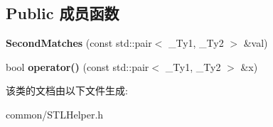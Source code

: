 \subsection*{Public 成员函数}
\begin{DoxyCompactItemize}
\item 
\hypertarget{class_second_matches_a9edfe0165b100299f50f2981c9ce624f}{{\bfseries Second\+Matches} (const std\+::pair$<$ \+\_\+\+Ty1, \+\_\+\+Ty2 $>$ \&val)}\label{class_second_matches_a9edfe0165b100299f50f2981c9ce624f}

\item 
\hypertarget{class_second_matches_ab26b85ce544d279c9de2bed1def3c6f0}{bool {\bfseries operator()} (const std\+::pair$<$ \+\_\+\+Ty1, \+\_\+\+Ty2 $>$ \&x)}\label{class_second_matches_ab26b85ce544d279c9de2bed1def3c6f0}

\end{DoxyCompactItemize}


该类的文档由以下文件生成\+:\begin{DoxyCompactItemize}
\item 
common/S\+T\+L\+Helper.\+h\end{DoxyCompactItemize}
